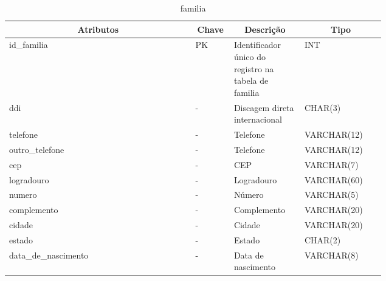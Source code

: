 \begin{enumerate}
    \begin{table}[H]
    \caption{familia}
    \label{idioma}
    	\centering\footnotesize
        \begin{tabular}{|p{0.40\linewidth} | p{0.04\linewidth} |  p{0.12\linewidth} | p{0.16\linewidth} |}  \hline
        \multicolumn{1}{|c|}{\textbf{Atributos}} &
        \multicolumn{1}{|c|}{\textbf{Chave}} &
        \multicolumn{1}{c|}{\textbf{Descrição}} &
        \multicolumn{1}{c|}{\textbf{Tipo}} \\ \hline
          
        id\_familia  &  
        PK & 
        Identificador único do registro na tabela de familia &
        INT
        \\  \hline
        
        ddi  &  
        - & 
        Discagem direta internacional &
        CHAR(3)
        \\  \hline
        
        telefone  &  
        - & 
        Telefone &
        VARCHAR(12)
        \\  \hline
        
        outro\_telefone  &  
        - & 
        Telefone &
        VARCHAR(12)
        \\  \hline
        
        cep  &  
        - & 
        CEP &
        VARCHAR(7)
        \\  \hline
        
        logradouro  &  
        - & 
        Logradouro &
        VARCHAR(60)
        \\  \hline
        
        numero  &  
        - & 
        Número &
        VARCHAR(5)
        \\  \hline
        
        complemento  &  
        - & 
        Complemento &
        VARCHAR(20)
        \\  \hline
        
        cidade  &  
        - & 
        Cidade &
        VARCHAR(20)
        \\  \hline
        
        estado  &  
        - & 
        Estado &
        CHAR(2)
        \\  \hline
        
        data\_de\_nascimento  &  
        - & 
        Data de nascimento &
        VARCHAR(8)
        \\  \hline
        

\end{tabular}
\end{table}
\end{enumerate}

